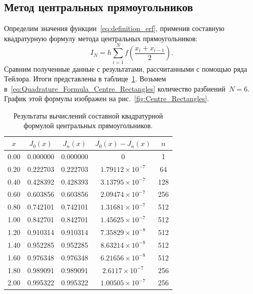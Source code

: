 \documentclass[a4paper, 14pt]{extarticle}
\begin{document}
    \subsection{Метод центральных прямоугольников}\label{subsec:center}
    Определим значения функции~\eqref{eq:definition_erf}, применив составную квадратурную формулу метода центральных прямоугольников:
    \begin{equation}
        \label{eq:Quadrature_Formula_Centre_Rectangles}
        I_{N} = h \sum\limits_{i=1}^{N} f\left(\frac{x_i + x_{i-1}}{2}\right).
    \end{equation}
    Сравним полученные данные с результатами, рассчитанными с помощью ряда Тейлора.
    Итоги представлены в таблице~\ref{tab:Centre_Rectangles}.
    Возьмем в~\eqref{eq:Quadrature_Formula_Centre_Rectangles} количество разбиений~$N=6$.
    График этой формулы изображен на рис.~\ref{fig:Centre_Rectangles}.
    \begin{table}[H]
        \centering
        \begin{tabular}{|c|c|c|c|c|}
            \hline
            $x$  & $J_0(x)$ & $J_n(x)$ & $J_0(x)-J_n(x)$        & $n$ \\ \hline
            0.00 & 0.000000 & 0.000000 & 0                      & 1   \\ \hline
            0.20 & 0.222703 & 0.222703 & $1.79112\times10^{-7}$ & 64  \\ \hline
            0.40 & 0.428392 & 0.428393 & $3.13795\times10^{-7}$ & 128 \\ \hline
            0.60 & 0.603856 & 0.603856 & $2.09474\times10^{-7}$ & 256 \\ \hline
            0.80 & 0.742101 & 0.742101 & $1.31681\times10^{-7}$ & 512 \\ \hline
            1.00 & 0.842701 & 0.842701 & $1.45625\times10^{-7}$ & 512 \\ \hline
            1.20 & 0.910314 & 0.910314 & $7.35829\times10^{-8}$ & 512 \\ \hline
            1.40 & 0.952285 & 0.952285 & $8.63214\times10^{-8}$ & 512 \\ \hline
            1.60 & 0.976348 & 0.976348 & $6.21656\times10^{-8}$ & 512 \\ \hline
            1.80 & 0.989091 & 0.989091 & $2.6117\times10^{-7}$  & 256 \\ \hline
            2.00 & 0.995322 & 0.995322 & $1.00505\times10^{-7}$ & 256 \\ \hline
        \end{tabular}
        \caption{Результаты вычислений составной квадратурной формулой центральных прямоугольников.}
        \label{tab:Centre_Rectangles}
    \end{table}
\end{document}
